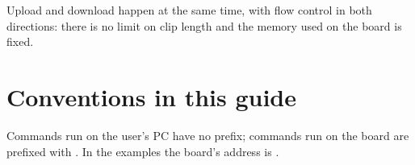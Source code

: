Upload and download happen at the same time, with flow control in both
directions: there is no limit on clip length and the memory used on the board
is fixed.

\section{Conventions in this guide}

Commands run on the user's PC have no prefix; commands run on the board are
prefixed with . In the examples the board's address is
.

